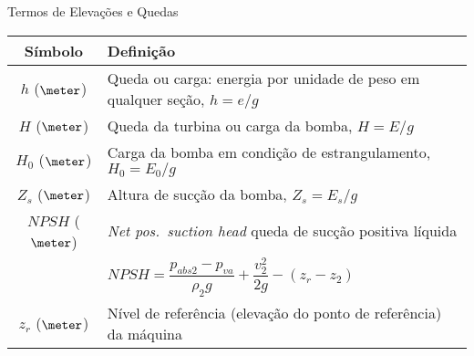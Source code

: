     \begin{frame}{Termos de Elevações e Quedas}\vspace*{-1em}
        \setlength{\tabcolsep}{2mm}
        \noindent\begin{longtable}{cp{110mm}}
            \alert{Símbolo} & \alert{Definição} \\
            \hline
            $h$ ($\meter$) &
            Queda ou carga: energia por unidade de peso em qualquer seção, \alert{$h = e/g$} \\
            $H$ ($\meter$) &
            Queda da turbina ou carga da bomba, \alert{$H = E/g$} \\
            $H_0$ ($\meter$) &
            Carga da bomba em condição de estrangulamento, \alert{$H_0 = E_0/g$} \\
            $Z_s$ ($\meter$) &
            Altura de sucção da bomba, \alert{$Z_s = E_s/g$} \\
            $NPSH$ ($\meter$) &
            \textit{Net pos.~suction head\/} queda de sucção positiva líquida \\
            & \alert{$NPSH = \dfrac{p_{abs2} - p_{va}}{\rho_2g} + \dfrac{v_2^2}{2g} - (z_r -
            z_2)$} \\
            $z_r$ ($\meter$) &
            Nível de referência (elevação do ponto de referência) da máquina \\
            \hline
        \end{longtable}
    \end{frame}

